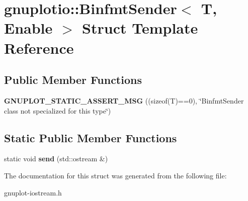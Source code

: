 \hypertarget{structgnuplotio_1_1BinfmtSender}{}\section{gnuplotio\+:\+:Binfmt\+Sender$<$ T, Enable $>$ Struct Template Reference}
\label{structgnuplotio_1_1BinfmtSender}
\subsection*{Public Member Functions}
\begin{DoxyCompactItemize}
\item 
\mbox{\label{structgnuplotio_1_1BinfmtSender_a02d7d348067625dc099e27249c24780a}} 
{\bfseries G\+N\+U\+P\+L\+O\+T\+\_\+\+S\+T\+A\+T\+I\+C\+\_\+\+A\+S\+S\+E\+R\+T\+\_\+\+M\+SG} ((sizeof(T)==0), \char`\"{}Binfmt\+Sender class not specialized for this type\char`\"{})
\end{DoxyCompactItemize}
\subsection*{Static Public Member Functions}
\begin{DoxyCompactItemize}
\item 
\mbox{\label{structgnuplotio_1_1BinfmtSender_a762010e3172c02e981252f93185b29c8}} 
static void {\bfseries send} (std\+::ostream \&)
\end{DoxyCompactItemize}


The documentation for this struct was generated from the following file\+:\begin{DoxyCompactItemize}
\item 
gnuplot-\/iostream.\+h\end{DoxyCompactItemize}
